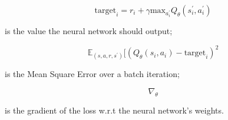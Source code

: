 \documentclass[14pt]{extarticle}
\begin{document}
\begin{flushleft}
\[\text{target}_i = r_i + \gamma\text{max}_{a_i^\prime}Q_{\theta}(s_i^{\prime},a_i^{\prime})\]
\vspace{-13mm}
\begin{center}
is the value the neural network should output;
\end{center}

\[\mathbb{E}_{(s,a,r,s^\prime)}[(Q_{\theta}(s_i,a_i) - \text{target}_i)^2\] 
\vspace{-12mm}
\begin{center}
is the Mean Square Error over a batch iteration;
\end{center}



\[\nabla_{\theta}\]
\vspace{-13mm}
\begin{center}
is the gradient of the loss w.r.t the neural network's weights.
\end{center}

\end{flushleft}
\end{document}
